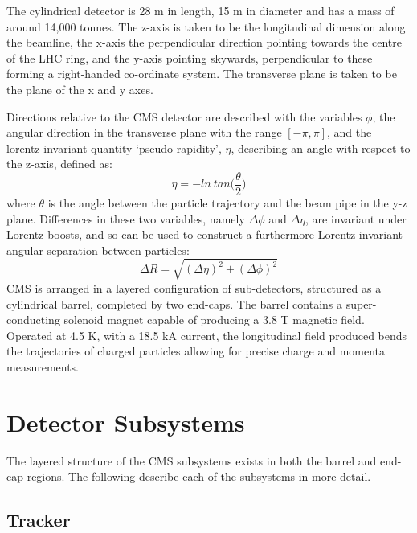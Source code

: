 The cylindrical detector is 28 m in length, 15 m in diameter and has a mass of 
around 14,000 tonnes. 
The z-axis is taken to be the longitudinal dimension along the beamline, the
x-axis the perpendicular direction pointing towards the centre of the LHC ring, 
and the y-axis pointing skywards, perpendicular to these forming a right-handed 
co-ordinate system. The transverse plane is taken to be the plane of the x and y
axes.

Directions relative to the CMS detector are described with the variables $\phi$,
the angular direction in the transverse plane with the range $[-\pi, \pi]$, and 
the lorentz-invariant quantity `pseudo-rapidity', $\eta$, describing an angle
with respect to the z-axis, defined as:
% 
\begin{equation}
\eta = - ln \ tan \Bigg( \frac{\theta}{2} \Bigg)
\end{equation}
% 
where $\theta$ is the angle between the particle trajectory and the beam pipe
in the y-z plane.
Differences in these two variables, namely $\Delta \phi$ and $\Delta 
\eta$, are invariant under Lorentz boosts, and so can be used to construct a 
furthermore Lorentz-invariant angular separation between particles:
% 
\begin{equation}
\Delta R = \sqrt{ (\Delta \eta)^2 + (\Delta \phi)^2}
\end{equation}
% 
CMS is arranged in a layered configuration of sub-detectors, structured as a 
cylindrical barrel, completed by two end-caps. The barrel contains a
super-conducting solenoid magnet capable of producing a 3.8 T magnetic field. 
Operated at 4.5 K, with a 18.5 kA current, the longitudinal field produced bends
the trajectories of charged particles allowing for precise charge and momenta 
measurements.

\section{Detector Subsystems}  %
\label{sec:detector_subsystems}

The layered structure of the CMS subsystems exists in both the barrel and
end-cap regions. The following describe each of the subsystems in more detail.

\subsection{Tracker}

